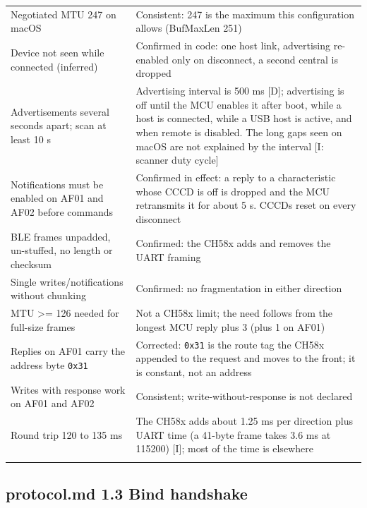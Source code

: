 {\begin{longtable}[]{@{}
  >{\raggedright\arraybackslash}p{}
  >{\raggedright\arraybackslash}p{}@{}}
Negotiated MTU 247 on macOS & Consistent: 247 is the maximum this
configuration allows (BufMaxLen 251) \\
Device not seen while connected (inferred) & Confirmed in code: one host
link, advertising re-enabled only on disconnect, a second central is
dropped \\
Advertisements several seconds apart; scan at least 10 s & Advertising
interval is 500 ms {[}D{]}; advertising is off until the MCU enables it
after boot, while a host is connected, while a USB host is active, and
when remote is disabled. The long gaps seen on macOS are not explained
by the interval {[}I: scanner duty cycle{]} \\
Notifications must be enabled on AF01 and AF02 before commands &
Confirmed in effect: a reply to a characteristic whose CCCD is off is
dropped and the MCU retransmits it for about 5 s. CCCDs reset on every
disconnect \\
BLE frames unpadded, un-stuffed, no length or checksum & Confirmed: the
CH58x adds and removes the UART framing \\
Single writes/notifications without chunking & Confirmed: no
fragmentation in either direction \\
MTU \textgreater= 126 needed for full-size frames & Not a CH58x limit;
the need follows from the longest MCU reply plus 3 (plus 1 on AF01) \\
Replies on AF01 carry the address byte \texttt{0x31} & Corrected:
\texttt{0x31} is the route tag the CH58x appended to the request and
moves to the front; it is constant, not an address \\
Writes with response work on AF01 and AF02 & Consistent;
write-without-response is not declared \\
Round trip 120 to 135 ms & The CH58x adds about 1.25 ms per direction
plus UART time (a 41-byte frame takes 3.6 ms at 115200) {[}I{]}; most of
the time is elsewhere \\*
\end{longtable}
}

\subsection{protocol.md 1.3 Bind
handshake}\label{protocol.md-1.3-bind-handshake}

